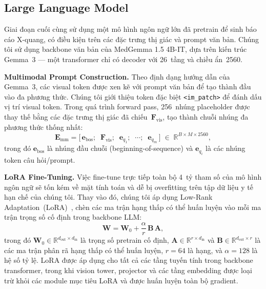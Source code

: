 \subsection{Large Language Model}

Giai đoạn cuối cùng sử dụng một mô hình ngôn ngữ lớn đã pretrain để sinh báo cáo X-quang, có điều kiện trên các đặc trưng thị giác và prompt văn bản. Chúng tôi sử dụng backbone văn bản của MedGemma 1.5 4B-IT, dựa trên kiến trúc Gemma~3 --- một transformer chỉ có decoder với 26~tầng và chiều ẩn~2560.

\textbf{Multimodal Prompt Construction.} Theo định dạng hướng dẫn của Gemma~3, các visual token được xen kẽ với prompt văn bản để tạo thành đầu vào đa phương thức. Chúng tôi giới thiệu token đặc biệt \texttt{<im\_patch>} để đánh dấu vị trí visual token. Trong quá trình forward pass, 256~nhúng placeholder được thay thế bằng các đặc trưng thị giác đã chiếu~$\mathbf{F}_{\text{vis}}$, tạo thành chuỗi nhúng đa phương thức thống nhất:
\begin{equation}
\mathbf{E}_{\text{mm}} = \big[\, \mathbf{e}_{\text{bos}} ;\;\; \mathbf{F}_{\text{vis}} ;\;\; \mathbf{e}_{q_1} ;\;\; \cdots ;\;\; \mathbf{e}_{q_m} \,\big] \;\in\; \mathbb{R}^{B \times M \times 2560},
\label{eq:multimodal_embed}
\end{equation}
trong đó $\mathbf{e}_{\text{bos}}$ là nhúng đầu chuỗi (beginning-of-sequence) và $\mathbf{e}_{q_i}$ là các nhúng token câu hỏi/prompt.

\textbf{LoRA Fine-Tuning.} Việc fine-tune trực tiếp toàn bộ 4~tỷ tham số của mô hình ngôn ngữ sẽ tốn kém về mặt tính toán và dễ bị overfitting trên tập dữ liệu y tế hạn chế của chúng tôi. Thay vào đó, chúng tôi áp dụng Low-Rank Adaptation~(LoRA)~\cite{hu2022lora}, chèn các ma trận hạng thấp có thể huấn luyện vào mỗi ma trận trọng số cố định trong backbone LLM:
\begin{equation}
\mathbf{W} = \mathbf{W}_0 + \frac{\alpha}{r}\, \mathbf{B}\, \mathbf{A},
\label{eq:lora}
\end{equation}
trong đó $\mathbf{W}_0 \in \mathbb{R}^{d_{\text{out}} \times d_{\text{in}}}$ là trọng số pretrain cố định, $\mathbf{A} \in \mathbb{R}^{r \times d_{\text{in}}}$ và $\mathbf{B} \in \mathbb{R}^{d_{\text{out}} \times r}$ là các ma trận phân rã hạng thấp có thể huấn luyện, $r = 64$ là hạng, và $\alpha = 128$ là hệ số tỷ lệ. LoRA được áp dụng cho tất cả các tầng tuyến tính trong backbone transformer, trong khi vision tower, projector và các tầng embedding được loại trừ khỏi các module mục tiêu LoRA và được huấn luyện toàn bộ gradient.

